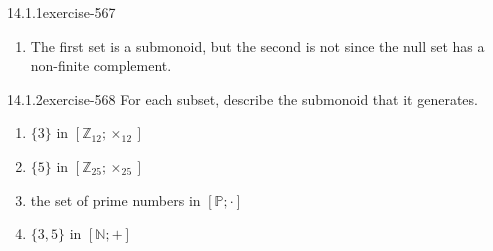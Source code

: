 \documentclass[twoside,10pt,]{book}
\numberwithin{equation}{section}
\begin{document}
\begin{divisionsolution}{14.1.1}{}{exercise-567}
\begin{enumerate}[label=(\alph*)]
\begin{equation*}
\begin{split}
(f\circ g)(n) & = f(g(n)) \leq g(n)\textrm{      since } f \textrm{ is in } S_1\\
& \leq n\textrm{       since } g \textrm{ is in } S_1 \Rightarrow f \circ g \in S_1
\end{split}
\end{equation*}
and the two conditions of a submonoid are satisfied and \(S_1\) is a submonoid of  \(\mathbb{N}^{\mathbb{N}}\).%
\item\hypertarget{li-2312}{}\hypertarget{p-5080}{}%
The first set is a submonoid, but the second is not since the null set has a non-finite complement.%
\end{enumerate}
%
\end{divisionsolution}%
\begin{divisionsolution}{14.1.2}{}{exercise-568}%
\hypertarget{p-5081}{}%
For each subset, describe the submonoid that it generates.\leavevmode%
\begin{enumerate}[label=(\alph*)]
\item\hypertarget{li-2313}{}\hypertarget{p-5082}{}%
\(\{3\}\) in \([\mathbb{Z}_{12};\times_{12}]\)%
\item\hypertarget{li-2314}{}\hypertarget{p-5083}{}%
\(\{5\} \textrm{ in } [\mathbb{Z}_{25};\times_{25}]\)%
\item\hypertarget{li-2315}{}\hypertarget{p-5084}{}%
the set of prime numbers in \([\mathbb{P}; \cdot ]\)%
\item\hypertarget{li-2316}{}\hypertarget{p-5085}{}%
\(\{3,5\} \textrm{ in } [\mathbb{N}; +]\)%
\end{enumerate}
%
\end{divisionsolution}%
\end{document}
